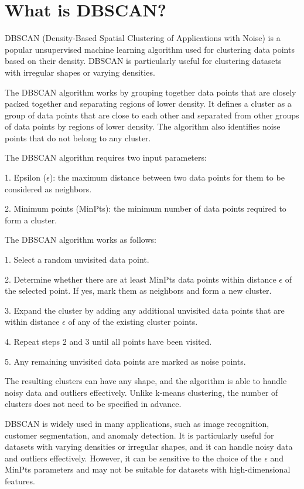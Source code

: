 \section{What is DBSCAN?}
DBSCAN (Density-Based Spatial Clustering of Applications with Noise) is a popular unsupervised machine learning algorithm used for clustering data points based on their density. DBSCAN is particularly useful for clustering datasets with irregular shapes or varying densities.

The DBSCAN algorithm works by grouping together data points that are closely packed together and separating regions of lower density. It defines a cluster as a group of data points that are close to each other and separated from other groups of data points by regions of lower density. The algorithm also identifies noise points that do not belong to any cluster.

The DBSCAN algorithm requires two input parameters:

1. Epsilon ($\epsilon$): the maximum distance between two data points for them to be considered as neighbors.

2. Minimum points (MinPts): the minimum number of data points required to form a cluster.

The DBSCAN algorithm works as follows:

1. Select a random unvisited data point.

2. Determine whether there are at least MinPts data points within distance $\epsilon$ of the selected point. If yes, mark them as neighbors and form a new cluster.

3. Expand the cluster by adding any additional unvisited data points that are within distance $\epsilon$ of any of the existing cluster points.

4. Repeat steps 2 and 3 until all points have been visited.

5. Any remaining unvisited data points are marked as noise points.

The resulting clusters can have any shape, and the algorithm is able to handle noisy data and outliers effectively. Unlike k-means clustering, the number of clusters does not need to be specified in advance.

DBSCAN is widely used in many applications, such as image recognition, customer segmentation, and anomaly detection. It is particularly useful for datasets with varying densities or irregular shapes, and it can handle noisy data and outliers effectively. However, it can be sensitive to the choice of the $\epsilon$ and MinPts parameters and may not be suitable for datasets with high-dimensional features.


